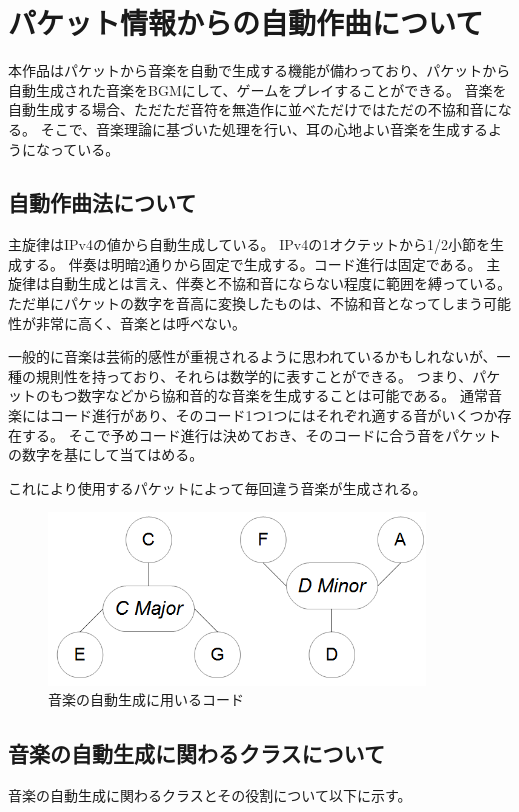 \documentclass[11pt,a4paper]{jsarticle}
\begin{document}
\section{パケット情報からの自動作曲について}
本作品はパケットから音楽を自動で生成する機能が備わっており、パケットから自動生成された音楽をBGMにして、ゲームをプレイすることができる。
音楽を自動生成する場合、ただただ音符を無造作に並べただけではただの不協和音になる。
そこで、音楽理論に基づいた処理を行い、耳の心地よい音楽を生成するようになっている。

\subsection{自動作曲法について}
主旋律はIPv4の値から自動生成している。
IPv4の1オクテットから1/2小節を生成する。
伴奏は明暗2通りから固定で生成する。コード進行は固定である。
主旋律は自動生成とは言え、伴奏と不協和音にならない程度に範囲を縛っている。
ただ単にパケットの数字を音高に変換したものは、不協和音となってしまう可能性が非常に高く、音楽とは呼べない。

一般的に音楽は芸術的感性が重視されるように思われているかもしれないが、一種の規則性を持っており、それらは数学的に表すことができる。
つまり、パケットのもつ数字などから協和音的な音楽を生成することは可能である。
通常音楽にはコード進行があり、そのコード1つ1つにはそれぞれ適する音がいくつか存在する。
そこで予めコード進行は決めておき、そのコードに合う音をパケットの数字を基にして当てはめる。

これにより使用するパケットによって毎回違う音楽が生成される。

\begin{figure}[htbp]
\centering
\includegraphics[width=10cm]{chord.png}
\caption{音楽の自動生成に用いるコード}
\end{figure}

\subsection{音楽の自動生成に関わるクラスについて}
音楽の自動生成に関わるクラスとその役割について以下に示す。
\end{document}
